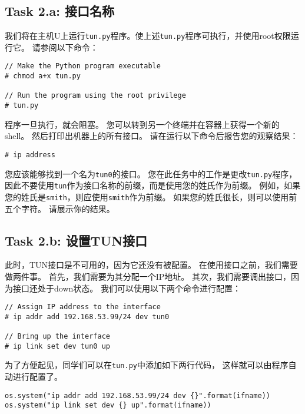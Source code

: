 \subsection{Task 2.a: 接口名称}

我们将在主机U上运行\verb|tun.py|程序。使上述\verb|tun.py|程序可执行，并使用root权限运行它。 
请参阅以下命令：

\begin{lstlisting}
// Make the Python program executable
# chmod a+x tun.py

// Run the program using the root privilege
# tun.py
\end{lstlisting}

程序一旦执行，就会阻塞。 
您可以转到另一个终端并在容器上获得一个新的shell。 
然后打印出机器上的所有接口。 
请在运行以下命令后报告您的观察结果：

\begin{lstlisting}
# ip address
\end{lstlisting}

您应该能够找到一个名为\verb|tun0|的接口。 
您在此任务中的工作是更改\verb|tun.py|程序，
因此不要使用\verb|tun|作为接口名称的前缀，而是使用您的姓氏作为前缀。 
例如，如果您的姓氏是\verb|smith|，则应使用\verb|smith|作为前缀。 
如果您的姓氏很长，则可以使用前五个字符。 
请展示你的结果。

\subsection{Task 2.b: 设置TUN接口}

此时，TUN接口是不可用的，因为它还没有被配置。 
在使用接口之前，我们需要做两件事。 
首先，我们需要为其分配一个IP地址。 
其次，我们需要调出接口，因为接口还处于down状态。 
我们可以使用以下两个命令进行配置：

\begin{lstlisting}
// Assign IP address to the interface
# ip addr add 192.168.53.99/24 dev tun0

// Bring up the interface
# ip link set dev tun0 up
\end{lstlisting}

为了方便起见，同学们可以在\verb|tun.py|中添加如下两行代码，
这样就可以由程序自动进行配置了。

\begin{lstlisting}
os.system("ip addr add 192.168.53.99/24 dev {}".format(ifname))
os.system("ip link set dev {} up".format(ifname))
\end{lstlisting}


